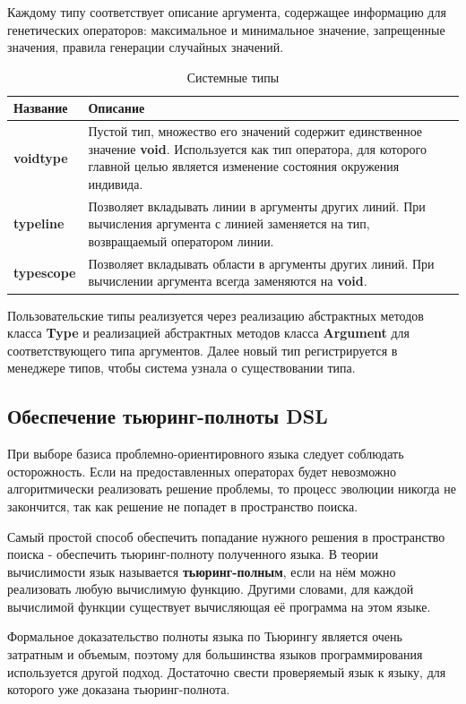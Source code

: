 \documentclass[russian,utf8,emptystyle]{eskdtext}
\begin{document}
\begin{spacing}{1.5}
Каждому типу соответствует описание аргумента, содержащее информацию для генетических операторов: максимальное и минимальное значение, запрещенные значения, правила генерации случайных значений.

\begin{table}
\centering
\caption{Системные типы}
\label{tab:system_types}
\begin{tabularx}{\textwidth}{X|X}
Название & Описание \\ 
\hline 
\textbf{voidtype} & Пустой тип, множество его значений содержит единственное значение \textbf{void}. Используется как тип оператора, для которого главной целью является изменение состояния окружения индивида. \\ \hline
\textbf{typeline} & Позволяет вкладывать линии в аргументы других линий. При вычисления аргумента с линией заменяется на тип, возвращаемый оператором линии. \\ \hline
\textbf{typescope} & Позволяет вкладывать области в аргументы других линий. При вычислении аргумента всегда заменяются на \textbf{void}. 
\end{tabularx} 
\end{table}

Пользовательские типы реализуется через реализацию абстрактных методов класса \textbf{Type} и реализацией абстрактных методов класса \textbf{Argument} для соответствующего типа аргументов. Далее новый тип регистрируется в менеджере типов, чтобы система узнала о существовании типа.

\subsection{Обеспечение тьюринг-полноты DSL}
При выборе базиса проблемно-ориентировного языка следует соблюдать осторожность. Если на предоставленных операторах будет невозможно алгоритмически реализовать решение проблемы, то процесс эволюции никогда не закончится, так как решение не попадет в пространство поиска.

Самый простой способ обеспечить попадание нужного решения в пространство поиска - обеспечить тьюринг-полноту полученного языка. В теории вычислимости язык называется \textbf{тьюринг-полным}, если на нём можно реализовать любую вычислимую функцию. Другими словами, для каждой вычислимой функции существует вычисляющая её программа на этом языке.

Формальное доказательство полноты языка по Тьюрингу является очень затратным и объемым, поэтому для большинства языков программирования используется другой подход. Достаточно свести проверяемый язык к языку, для которого уже доказана тьюринг-полнота.


\end{spacing}
\end{document}
